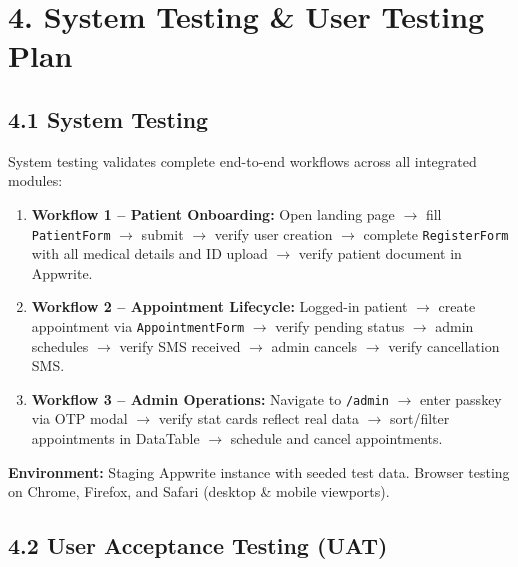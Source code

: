 \documentclass[12pt,a4paper]{article}
\begin{document}
\section{4. System Testing \& User Testing Plan}

\subsection{4.1 System Testing}

System testing validates complete end-to-end workflows across all integrated modules:

\begin{enumerate}[leftmargin=*, noitemsep]
    \item \textbf{Workflow 1 -- Patient Onboarding:} Open landing page $\rightarrow$ fill \texttt{PatientForm} $\rightarrow$ submit $\rightarrow$ verify user creation $\rightarrow$ complete \texttt{RegisterForm} with all medical details and ID upload $\rightarrow$ verify patient document in Appwrite.
    \item \textbf{Workflow 2 -- Appointment Lifecycle:} Logged-in patient $\rightarrow$ create appointment via \texttt{AppointmentForm} $\rightarrow$ verify pending status $\rightarrow$ admin schedules $\rightarrow$ verify SMS received $\rightarrow$ admin cancels $\rightarrow$ verify cancellation SMS.
    \item \textbf{Workflow 3 -- Admin Operations:} Navigate to \texttt{/admin} $\rightarrow$ enter passkey via OTP modal $\rightarrow$ verify stat cards reflect real data $\rightarrow$ sort/filter appointments in DataTable $\rightarrow$ schedule and cancel appointments.
\end{enumerate}

\textbf{Environment:} Staging Appwrite instance with seeded test data. Browser testing on Chrome, Firefox, and Safari (desktop \& mobile viewports).

\subsection{4.2 User Acceptance Testing (UAT)}
\end{document}
